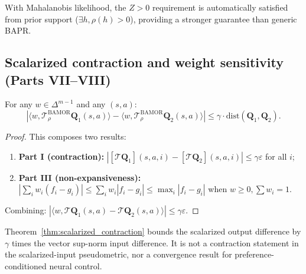 \begin{corollary}
\label{cor:mahalanobis}
With Mahalanobis likelihood, the $Z > 0$ requirement is automatically satisfied from prior support ($\exists h, \rho(h) > 0$), providing a stronger guarantee than generic BAPR.
\end{corollary}


\subsection{Scalarized contraction and weight sensitivity (Parts VII--VIII)}
\label{sec:scalarized}

\begin{theorem}
\label{thm:scalarized_contraction}
For any $w \in \Delta^{m-1}$ and any $(s,a)$:
\begin{equation}
    |\langle w, \mathcal{T}^{\mathrm{BAMOR}}_\rho \mathbf{Q}_1(s,a) \rangle - \langle w, \mathcal{T}^{\mathrm{BAMOR}}_\rho \mathbf{Q}_2(s,a) \rangle| \le \gamma \cdot \mathrm{dist}(\mathbf{Q}_1, \mathbf{Q}_2).
\end{equation}
\end{theorem}

\begin{proof}
This composes two results:
\begin{enumerate}
    \item \textbf{Part I (contraction):} $|[\mathcal{T}\mathbf{Q}_1](s,a,i) - [\mathcal{T}\mathbf{Q}_2](s,a,i)| \le \gamma\varepsilon$ for all $i$;
    \item \textbf{Part III (non-expansiveness):} $|\sum_i w_i (f_i - g_i)| \le \sum_i w_i |f_i - g_i| \le \max_i |f_i - g_i|$ when $w \ge 0, \sum w_i = 1$.
\end{enumerate}
Combining: $|\langle w, \mathcal{T}\mathbf{Q}_1(s,a) - \mathcal{T}\mathbf{Q}_2(s,a) \rangle| \le \gamma\varepsilon$.
\end{proof}

\begin{remark}
Theorem~\ref{thm:scalarized_contraction} bounds the scalarized output difference by $\gamma$ times the vector sup-norm input difference. It is not a contraction statement in the scalarized-input pseudometric, nor a convergence result for preference-conditioned neural control.
\end{remark}


